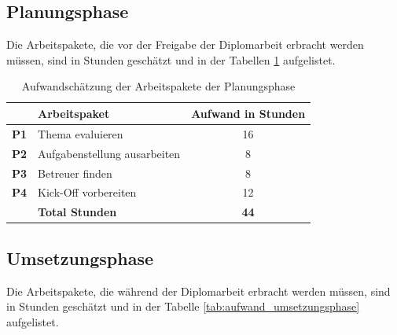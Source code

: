 \subsection{Planungsphase}
Die Arbeitspakete, die vor der Freigabe der Diplomarbeit erbracht werden müssen,
sind in Stunden geschätzt und in der Tabellen \ref{tab:auwand_planungsphase} 
aufgelistet.

\begin{table}[htbp]
\begin{center}
    \begin{tabular}{llc}
        \toprule & \textbf{Arbeitspaket} & \textbf{Aufwand in Stunden} \\
        \midrule \textbf{P1} & Thema evaluieren & 16 \\
        \midrule \textbf{P2} & Aufgabenstellung ausarbeiten & 8 \\
        \midrule \textbf{P3} & Betreuer finden & 8 \\
        \midrule \textbf{P4} & Kick-Off vorbereiten & 12 \\
        \bottomrule & \textbf{Total Stunden} & \textbf{44} \\
        \bottomrule
    \end{tabular}
    \caption{Aufwandschätzung der Arbeitspakete der Planungsphase}
    \label{tab:auwand_planungsphase}
\end{center}
\end{table}

\subsection{Umsetzungsphase}
Die Arbeitspakete, die während der Diplomarbeit erbracht werden müssen, sind
in Stunden geschätzt und in der Tabelle \ref{tab:aufwand_umsetzungsphase}
aufgelistet.

